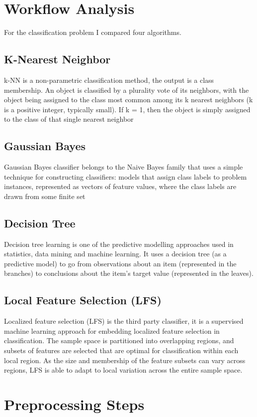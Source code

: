 \documentclass[pdftex,10px,a4paper,oneside]{article}
\begin{document}
\section{Workflow Analysis}
For the classification problem I compared four algorithms.
\subsection{K-Nearest Neighbor}
k-NN is a non-parametric  classification method, the output is a class membership. An object is classified by a plurality vote of its neighbors, with the object being assigned to the class most common among its k nearest neighbors (k is a positive integer, typically small). If k = 1, then the object is simply assigned to the class of that single nearest neighbor\cite{knn}
\subsection{Gaussian Bayes}
Gaussian Bayes classifier belongs to the Naive Bayes family that uses a simple technique for constructing classifiers: models that assign class labels to problem instances, represented as vectors of feature values, where the class labels are drawn from some finite set\cite{gbaye}
\subsection{Decision Tree}
Decision tree learning is one of the predictive modelling approaches used in statistics, data mining and machine learning. It uses a decision tree (as a predictive model) to go from observations about an item (represented in the branches) to conclusions about the item's target value (represented in the leaves).\cite{dec_tree}
\subsection{Local Feature Selection (LFS)}
Localized feature selection (LFS) is the third party classifier, it is a supervised machine learning approach for embedding localized feature selection in classification. The sample space is partitioned into overlapping regions, and subsets of features are selected that are optimal for classification within each local region. As the size and membership of the feature subsets can vary across regions, LFS is able to adapt to local variation across the entire sample space\cite{lfs}.
\section{Preprocessing Steps}
\end{document}
